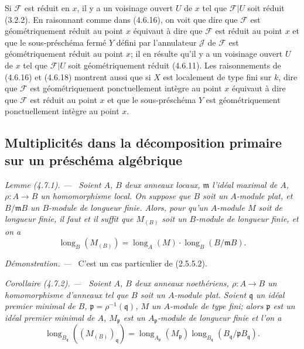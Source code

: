 \documentclass[10pt,oneside]{book}
\newcommand{\oldpage}[2][]{%
  \setcounter{footnote}{0}%
  \marginpar{\scriptsize\textbf{#1}~|~#2}\ignorespaces}
\newenvironment{corollary}[1][]{%
  \par\medskip\noindent\itshape Corollaire (#1). ---\ }{\par}
\newenvironment{lemma}[1][]{%
  \par\medskip\noindent\itshape Lemme (#1). ---\ }{\par}
\newenvironment{proof}{%
  \par\medskip\noindent\textit{Démonstration. ---\ }}{\par}
\begin{document}
\oldpage[IV-2]{75}

Si $\mathscr F$ est réduit en $x$, il y a un voisinage ouvert $U$ de $x$ tel
que $\mathscr F|U$ soit réduit (3.2.2). En raisonnant comme dans (4.6.16), on
voit que dire que $\mathscr F$ est géométriquement réduit au point $x$
équivaut à dire que $\mathscr F$ est réduit au point $x$ et que le
sous-préschéma fermé $Y$ défini par l'annulateur $\mathscr J$ de $\mathscr F$
est géométriquement réduit au point $x$; il en résulte qu'il y a un voisinage
ouvert $U$ de $x$ tel que $\mathscr F|U$ soit géométriquement réduit (4.6.11).
Les raisonnements de (4.6.16) et (4.6.18) montrent aussi que si $X$ est
localement de type fini sur $k$, dire que $\mathscr F$ est géométriquement
ponctuellement intègre au point $x$ équivaut à dire que $\mathscr F$ est
réduit au point $x$ et que le sous-préschéma $Y$ est géométriquement
ponctuellement intègre au point $x$.

\subsection{Multiplicités dans la décomposition primaire sur un préschéma
algébrique}
\label{subsection:IV.4.7-fr}

\begin{lemma}[4.7.1]
\label{IV.2.4.7.1-fr}
Soient $A$, $B$ deux anneaux locaux, $\mathfrak m$ l'idéal maximal de $A$,
$\rho:A\to B$ un homomorphisme local. On suppose que $B$ soit un $A$-module
plat, et $B/\mathfrak mB$ un $B$-module de longueur finie. Alors, pour qu'un
$A$-module $M$ soit de longueur finie, il faut et il suffit que $M_{(B)}$ soit
un $B$-module de longueur finie, et on a
\begin{equation}
\operatorname{long}_B(M_{(B)})
=\operatorname{long}_A(M)\cdot\operatorname{long}_B(B/\mathfrak mB).
\tag{4.7.1.1}
\label{IV.2.4.7.1.1-fr}
\end{equation}
\end{lemma}

\begin{proof}
C'est un cas particulier de (2.5.5.2).
\end{proof}


\begin{corollary}[4.7.2]
\label{IV.2.4.7.2-fr}
Soient $A$, $B$ deux anneaux noethériens, $\rho:A\to B$ un homomorphisme
d'anneaux tel que $B$ soit un $A$-module plat. Soient $\mathfrak q$ un idéal
premier minimal de $B$, $\mathfrak p=\rho^{-1}(\mathfrak q)$, $M$ un
$A$-module de type fini; alors $\mathfrak p$ est un idéal premier minimal de
$A$, $M_{\mathfrak p}$ est un $A_{\mathfrak p}$-module de longueur finie et
l'on a
\begin{equation}
\operatorname{long}_{B_{\mathfrak q}}((M_{(B)})_{\mathfrak q})
=\operatorname{long}_{A_{\mathfrak p}}(M_{\mathfrak p})
 \operatorname{long}_{B_{\mathfrak q}}
 (B_{\mathfrak q}/\mathfrak pB_{\mathfrak q}).
\tag{4.7.2.1}
\label{IV.2.4.7.2.1-fr}
\end{equation}
\end{corollary}
\end{document}
